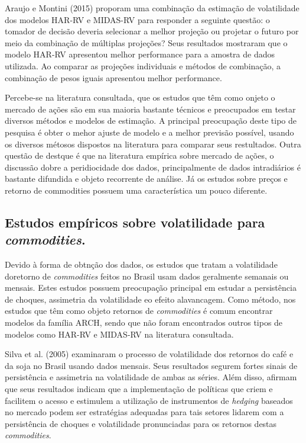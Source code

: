 \documentclass[]{article}
\begin{document}
Araujo e Montini (2015) proporam uma combinação da estimação de
volatilidade dos modelos HAR-RV e MIDAS-RV para responder a seguinte
questão: o tomador de decisão deveria selecionar a melhor projeção ou
projetar o futuro por meio da combinação de múltiplas projeções? Seus
resultados mostraram que o modelo HAR-RV apresentou melhor performance
para a amostra de dados utilizada. Ao comparar as projeções individuais
e métodos de combinação, a combinação de pesos iguais apresentou melhor
performance.

Percebe-se na literatura consultada, que os estudos que têm como onjeto
o mercado de ações são em sua maioria bastante técnicos e preocupados em
testar diversos métodos e modelos de estimação. A principal preocupação
deste tipo de pesquisa é obter o mehor ajuste de modelo e a melhor
previsão possível, usando os diversos métosos dispostos na literatura
para comparar seus restultados. Outra questão de destque é que na
literatura empírica sobre mercado de ações, o discussão dobre a
peridiocidade dos dados, principalmente de dados intradiários é bastante
difundida e objeto recorrente de análise. Já os estudos sobre preços e
retorno de commodities possuem uma característica um pouco diferente.

\subsection{\texorpdfstring{Estudos empíricos sobre volatilidade para
\emph{commodities}.}{Estudos empíricos sobre volatilidade para commodities.}}\label{estudos-empiricos-sobre-volatilidade-para-commodities.}

Devido à forma de obtnção dos dados, os estudos que tratam a
volatilidade doretorno de \emph{commodities} feitos no Brasil usam dados
geralmente semanais ou mensais. Estes estudos possuem preocupação
principal em estudar a persistência de choques, assimetria da
volatilidade eo efeito alavancagem. Como método, nos estudos que têm
como objeto retornos de \emph{commodities} é comum encontrar modelos da
família ARCH, sendo que não foram encontrados outros tipos de modelos
como HAR-RV e MIDAS-RV na literatura consultada.

Silva et al. (2005) examinaram o processo de volatilidade dos retornos
do café e da soja no Brasil usando dados mensais. Seus resultados
segurem fortes sinais de persistência e assimetria na volatilidade de
ambas as séries. Além disso, afirmam que seus resultados indicam que a
implementação de políticas que criem e facilitem o acesso e estimulem a
utilização de instrumentos de \emph{hedging} baseados no mercado podem
ser estratégias adequadas para tais setores lidarem com a persistência
de choques e volatilidade pronunciadas para os retornos destas
\emph{commodities}.
\end{document}
